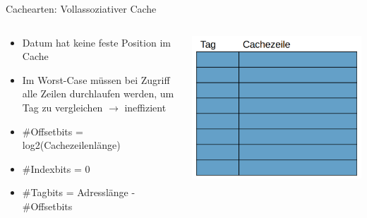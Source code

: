\documentclass[
  german,            %
  aspectratio=169,    %
]{tumbeamer}
\begin{document}
\begin{frame}[c]{Cachearten: Vollassoziativer Cache}{}
	\begin{columns}[c]
	  \begin{column}{0.5\textwidth}
		\begin{itemize}
		  \item Datum hat keine feste Position im Cache
		  \item Im Worst-Case müssen bei Zugriff alle Zeilen durchlaufen werden, um Tag zu vergleichen $\rightarrow$ ineffizient
		  \item \#Offsetbits = log2(Cachezeilenlänge)
		  \item \#Indexbits = 0
		  \item \#Tagbits = Adresslänge - \#Offsetbits
		\end{itemize}
	  \end{column}
	  \begin{column}{0.5\textwidth}
		\includegraphics[width=\linewidth]{w05_vollassoz_rep.png}
	  \end{column}
	\end{columns}
\end{frame}
  
\end{document}
